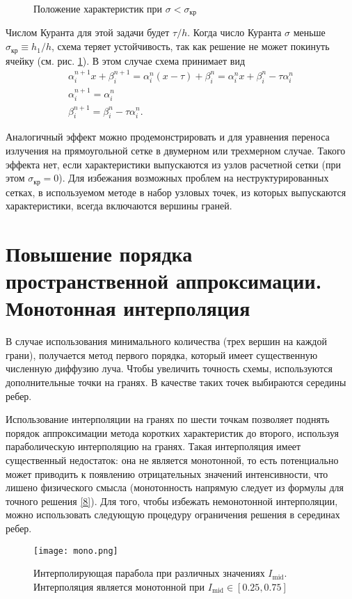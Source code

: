 \begin{figure}[ht!]
\caption{Положение характеристик при $\sigma < \sigma_\text{кр}$}
\label{fig:5}
\end{figure}
Числом Куранта для этой задачи будет $\tau/h$. Когда число Куранта $\sigma$ меньше $\sigma_\text{кр} \equiv h_1/h$, схема теряет устойчивость, так как решение не может покинуть ячейку (см. рис. \ref{fig:5}). В этом случае схема принимает вид
\begin{gather*}
\alpha^{n+1}_i x + \beta^{n+1}_i = \alpha^{n}_i (x - \tau) + \beta^{n}_i
= \alpha^{n}_i x + \beta^{n}_i - \tau \alpha_i^{n}\\
\alpha^{n+1}_i = \alpha^n_i\\
\beta^{n+1}_i = \beta^n_i - \tau \alpha^n_i.
\end{gather*}

Аналогичный эффект можно продемонстрировать и для уравнения переноса излучения на прямоугольной сетке в двумерном или трехмерном случае. Такого эффекта нет, если характеристики выпускаются из узлов расчетной сетки (при этом $\sigma_\text{кр} = 0$). Для избежания возможных проблем на неструктурированных сетках, в используемом методе в набор узловых точек, из которых выпускаются характеристики, всегда включаются вершины граней. 

\section{Повышение порядка пространственной аппроксимации. Монотонная интерполяция}
В случае использования минимального количества (трех вершин на каждой грани), получается метод первого порядка, который имеет существенную численную диффузию луча. Чтобы увеличить точность схемы, используются дополнительные точки на гранях. В качестве таких точек выбираются середины ребер. 

Использование интерполяции на гранях по шести точкам позволяет поднять порядок аппроксимации метода коротких характеристик до второго, используя параболическую интерполяцию на гранях. Такая интерполяция имеет существенный недостаток: она не является монотонной, то есть потенциально может приводить к появлению отрицательных значений интенсивности, что лишено физического смысла (монотонность напрямую следует из формулы для точного решения \eqref{8}). Для того, чтобы избежать немонотонной интерполяции, можно использовать следующую процедуру ограничения решения в серединах ребер. 
\begin{figure}[ht!]
\centering
\texttt{[image: mono.png]}
\caption{Интерполирующая парабола при различных значениях $I_\text{mid}$. Интерполяция является монотонной при $I_\text{mid} \in [0.25, 0.75]$}
\label{fig:8}
\end{figure}

